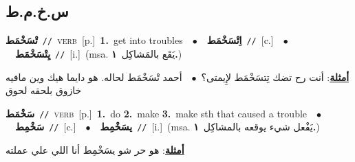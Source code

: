 \documentclass[10pt,a4paper,twoside]{article} %
\begin{document}
\begin{multicols}{2}
\vspace{-3mm}
\subsection*{\color{blue}\foreignlanguage{arabic}{س.خ.م.ط}\color{blue}{}} 

{\setlength\topsep{0pt}\textbf{\foreignlanguage{arabic}{تْسَخْمَط}}\ {\color{gray}\texttt{//}\color{black}}\ \textsc{verb}\ [p.]\ \textbf{1.}~get into troubles\ \ $\bullet$\ \ \setlength\topsep{0pt}\textbf{\foreignlanguage{arabic}{اِتْسَخْمَط}}\ {\color{gray}\texttt{//}\color{black}}\ [c.]\ \ $\bullet$\ \ \setlength\topsep{0pt}\textbf{\foreignlanguage{arabic}{يِتْسَخْمَط}}\ {\color{gray}\texttt{//}\color{black}}\ [i.]\ \color{gray}(msa. \foreignlanguage{arabic}{يَقَع بالمَشاكِل}~\foreignlanguage{arabic}{\textbf{١.}})\color{black}\  \begin{flushright}\color{gray}\foreignlanguage{arabic}{\textbf{\underline{\foreignlanguage{arabic}{أمثلة}}}: أنت رح تضك تِتسَخْمَط لإِيمتى؟\ $\bullet$\ \  أحمد تْسَخْمَط لحاله. هو دايما هيك وين مافيه خازوق بلحقه لحوق}\end{flushright}\color{black}} \vspace{2mm}

{\setlength\topsep{0pt}\textbf{\foreignlanguage{arabic}{سَخْمَط}}\ {\color{gray}\texttt{//}\color{black}}\ \textsc{verb}\ [p.]\ \textbf{1.}~do  \textbf{2.}~make  \textbf{3.}~make sth that caused a trouble\ \ $\bullet$\ \ \setlength\topsep{0pt}\textbf{\foreignlanguage{arabic}{سَخْمِط}}\ {\color{gray}\texttt{//}\color{black}}\ [c.]\ \ $\bullet$\ \ \setlength\topsep{0pt}\textbf{\foreignlanguage{arabic}{يسَخْمِط}}\ {\color{gray}\texttt{//}\color{black}}\ [i.]\ \color{gray}(msa. \foreignlanguage{arabic}{يَفْعل شيء يوقعه بالمشاكِل}~\foreignlanguage{arabic}{\textbf{١.}})\color{black}\  \begin{flushright}\color{gray}\foreignlanguage{arabic}{\textbf{\underline{\foreignlanguage{arabic}{أمثلة}}}: هو حر شو يسَخْمِط أنا اللي علي عملته}\end{flushright}\color{black}} \vspace{2mm}


\end{multicols}
\end{document}
